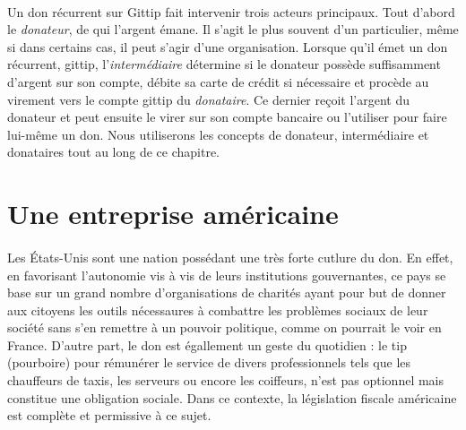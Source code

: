             \paragraph{}
                Un don récurrent sur Gittip fait intervenir trois acteurs
                principaux.
                Tout d'abord le \emph{donateur}, de qui l'argent émane.
                Il s'agit le plus souvent d'un particulier, même si dans
                certains cas, il peut s'agir d'une organisation.
                Lorsque qu'il émet un don récurrent, gittip,
                l'\emph{intermédiaire} détermine si 
                le donateur possède suffisamment d'argent sur son compte,
                débite sa carte de crédit si nécessaire et procède au
                virement vers le compte gittip du \emph{donataire}. Ce dernier
                reçoit l'argent du donateur et peut ensuite le virer sur son
                compte bancaire ou l'utiliser pour faire lui-même un don.
                Nous utiliserons les concepts de donateur, intermédiaire et
                donataires tout au long de ce chapitre. 
    \section{Une entreprise américaine}
        \paragraph{}
            Les États-Unis sont une nation possédant une très forte cutlure
            du don. En effet, en favorisant l'autonomie vis à vis de leurs
            institutions gouvernantes, ce pays se base sur un grand nombre
            d'organisations de charités ayant pour but de donner aux citoyens
            les outils nécessaures à combattre les problèmes sociaux de leur
            société sans s'en remettre à un pouvoir politique, comme on
            pourrait le voir en France.
            D'autre part, le don est égallement un geste du quotidien :
            le tip (pourboire) pour rémunérer le service de divers
            professionnels tels que les chauffeurs de taxis, les serveurs ou
            encore les coiffeurs, n'est pas optionnel mais constitue une 
            obligation sociale.
            Dans ce contexte, la législation fiscale américaine est
            complète et permissive à ce sujet.
